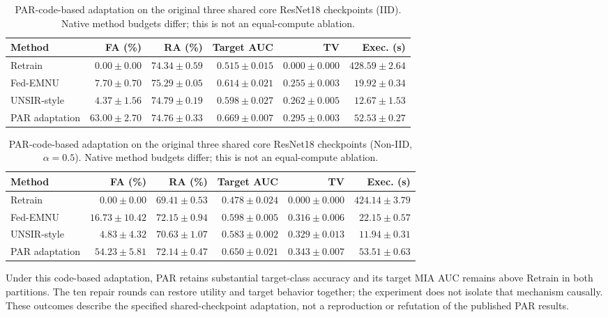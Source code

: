 \documentclass[software,article,submit,moreauthors]{Definitions/mdpi}
\begin{document}
\begin{table}[H]
\caption{PAR-code-based adaptation on the original three shared core ResNet18 checkpoints (IID). Native method budgets differ; this is not an equal-compute ablation.}
\label{tab:par-iid}
\centering\footnotesize\setlength{\tabcolsep}{3.5pt}
\begin{tabular}{lrrrrr}
\toprule
Method & FA (\%) & RA (\%) & Target AUC & TV & Exec. (s)\\
\midrule
Retrain & $0.00 \pm 0.00$ & $74.34 \pm 0.59$ & $0.515 \pm 0.015$ & $0.000 \pm 0.000$ & $428.59 \pm 2.64$\\
Fed-EMNU & $7.70 \pm 0.70$ & $75.29 \pm 0.05$ & $0.614 \pm 0.021$ & $0.255 \pm 0.003$ & $19.92 \pm 0.34$\\
UNSIR-style & $4.37 \pm 1.56$ & $74.79 \pm 0.19$ & $0.598 \pm 0.027$ & $0.262 \pm 0.005$ & $12.67 \pm 1.53$\\
PAR adaptation & $63.00 \pm 2.70$ & $74.76 \pm 0.33$ & $0.669 \pm 0.007$ & $0.295 \pm 0.003$ & $52.53 \pm 0.27$\\
\bottomrule
\end{tabular}
\end{table}

\begin{table}[H]
\caption{PAR-code-based adaptation on the original three shared core ResNet18 checkpoints (Non-IID, $\alpha=0.5$). Native method budgets differ; this is not an equal-compute ablation.}
\label{tab:par-noniid}
\centering\footnotesize\setlength{\tabcolsep}{3.5pt}
\begin{tabular}{lrrrrr}
\toprule
Method & FA (\%) & RA (\%) & Target AUC & TV & Exec. (s)\\
\midrule
Retrain & $0.00 \pm 0.00$ & $69.41 \pm 0.53$ & $0.478 \pm 0.024$ & $0.000 \pm 0.000$ & $424.14 \pm 3.79$\\
Fed-EMNU & $16.73 \pm 10.42$ & $72.15 \pm 0.94$ & $0.598 \pm 0.005$ & $0.316 \pm 0.006$ & $22.15 \pm 0.57$\\
UNSIR-style & $4.83 \pm 4.32$ & $70.63 \pm 1.07$ & $0.583 \pm 0.002$ & $0.329 \pm 0.013$ & $11.94 \pm 0.31$\\
PAR adaptation & $54.23 \pm 5.81$ & $72.14 \pm 0.47$ & $0.650 \pm 0.021$ & $0.343 \pm 0.007$ & $53.51 \pm 0.63$\\
\bottomrule
\end{tabular}
\end{table}

Under this code-based adaptation, PAR retains substantial target-class accuracy and its target MIA AUC remains above Retrain in both partitions. The ten repair rounds can restore utility and target behavior together; the experiment does not isolate that mechanism causally. These outcomes describe the specified shared-checkpoint adaptation, not a reproduction or refutation of the published PAR results.
\end{document}
